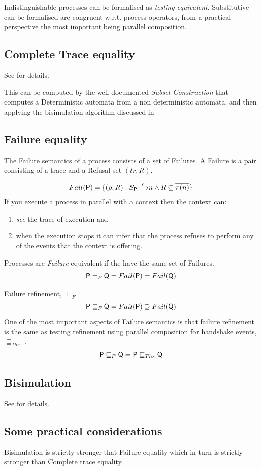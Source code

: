 \documentclass[]{article}
\begin{document}
Indistinguishable processes  can be formalised as \emph{testing equivalent}. Substitutive can be formalised are congruent w.r.t. process operators, from a practical perspective the most important being parallel composition.


 \subsection{Complete Trace equality}
 See  for details.

 This can be computed by the well documented \emph{Subset Construction} that computes a Deterministic automata from a non deterministic automata. and then applying the  bisimulation  algorithm discussed in 

 \subsection{Failure equality}
 The Failure semantics of a process consists of a set of Failures. A Failure  is a pair consisting of a trace and a Refusal set $(tr,R)$.

 \[ Fail({\sf P}) = \{(\rho ,R) : {S_{\sf P}}{\stackrel{\rho}{\longrightarrow}}{n}  \land R \subseteq \overline{ \pi(n) } \}\]
 If you execute a process in parallel with a context then the context can:
 \begin{enumerate}
 \item \emph{see} the trace of execution and
 \item when the execution stops it can infer that the process refuses to perform any of the events that the context is offering.
 \end{enumerate}
 Processes are \emph{Failure} equivalent if the have the same set of Failures.
 \[{\sf P}=_F{\sf Q} = Fail({\sf P}) = Fail({\sf Q})\]

 Failure refinement, $\sqsubseteq_F$
  \[{\sf P}\sqsubseteq_F{\sf Q} = Fail({\sf P}) \supseteq Fail({\sf Q})\]
One of the most important aspects of Failure semantics is that failure refinement is the same as testing refinement using parallel composition for handshake events, $\sqsubseteq_{Ths}$ .
  \[{\sf P}\sqsubseteq_F{\sf Q} = {\sf P}\sqsubseteq_{Ths}{\sf Q} \]


 \subsection{Bisimulation}
  See   for details.

 \subsection{Some practical considerations}
 Bisimulation is strictly stronger that Failure equality which in turn is strictly stronger than Complete trace equality.
\end{document}
